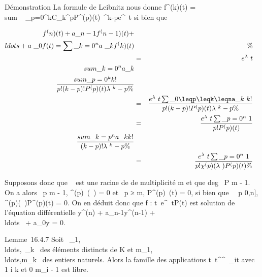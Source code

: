 \documentclass[]{article}
\begin{document}
Démonstration La formule de Leibnitz nous donne f^(k)(t)
= \\sum ~
\_p=0^kC\_k^pP^(p)(t)\lambda~^k-pe^\lambda~t
si bien que

\begin{align*} f^(n)(t) + a\_
n-1f^(n-1)(t) +
\\ldots + a~\_
0f(t) = \sum \_k=0^na~\_
kf^(k)(t)&&\%& \\ & =&
e^\lambda~t \\sum
\_k=0^na\_ k \\sum
\_p=0^k k! \over p!(k - p)!
P^(p)(t)\lambda~^k-p \%&
\\ & =& e^\lambda~t
\sum \_0\leqp\leqk\leqna\_k~ k!
\over p!(k - p)! P^(p)(t)\lambda~^k-p
\%& \\ & =& e^\lambda~t
\sum \_p=0^n~ 1
\over p! P^(p)(t)\\sum
\_k=p^na\_ k k! \over (k - p)!
\lambda~^k-p\%& \\ & =&
e^\lambda~t \sum \_p=0^n~ 1
\over p! \chi^(p)(\lambda~)P^(p)(t) \%&
\\ \end{align*}

Supposons donc que \lambda~ est une racine de \chi de multiplicité m et que
deg~ P \leq m - 1. On a alors
\forall~p \leq m - 1, \chi^(p)~(\lambda~) = 0 et
\forall~p ≥ m, P^(p)~(t) = 0, si bien que
\forall~~p \in {[}0,n{]},
\chi^(p)(\lambda~)P^(p)(t) = 0. On en déduit donc que f :
t\mapsto~e^\lambda~tP(t) est solution de
l'équation différentielle y^(n) +
a\_n-1y^(n-1) +
\\ldots~ +
a\_0y = 0.

Lemme~16.4.7 Soit
\lambda~\_1,\\ldots,\lambda~\_k~
des éléments distincts de K et
m\_1,\\ldots,m\_k~
des entiers naturels. Alors la famille des applications
t\mapsto~t^\jmathe^\lambda~\_it
avec 1 \leq i \leq k et 0 \leq \jmath \leq m\_i - 1 est libre.
\end{document}
